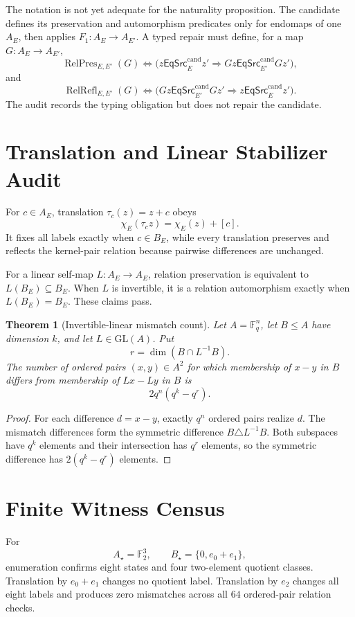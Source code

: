 \documentclass[11pt]{article}
\newtheorem{theorem}{Theorem}
\newcommand{\Ftwo}{\mathbb F_2}
\newcommand{\EqCand}{\mathsf{EqSrc}^{\mathrm{cand}}}
\begin{document}
The notation is not yet adequate for the naturality proposition. The candidate
defines its preservation and automorphism predicates only for endomaps of one
\(A_E\), then applies \(F_1:A_E\to A_{E'}\). A typed repair must define, for a
map \(G:A_E\to A_{E'}\),
\[
\operatorname{RelPres}_{E,E'}(G)
\Longleftrightarrow
\bigl(z\EqCand_Ez'\Rightarrow Gz\EqCand_{E'}Gz'\bigr),
\]
and
\[
\operatorname{RelRefl}_{E,E'}(G)
\Longleftrightarrow
\bigl(Gz\EqCand_{E'}Gz'\Rightarrow z\EqCand_Ez'\bigr).
\]
The audit records the typing obligation but does not repair the candidate.

\section{Translation and Linear Stabilizer Audit}

For \(c\in A_E\), translation \(\tau_c(z)=z+c\) obeys
\[
\chi_E(\tau_cz)=\chi_E(z)+[c].
\]
It fixes all labels exactly when \(c\in B_E\), while every translation
preserves and reflects the kernel-pair relation because pairwise differences
are unchanged.

For a linear self-map \(L:A_E\to A_E\), relation preservation is equivalent
to \(L(B_E)\subseteq B_E\). When \(L\) is invertible, it is a relation
automorphism exactly when \(L(B_E)=B_E\). These claims pass.

\begin{theorem}[Invertible-linear mismatch count]
Let \(A=\mathbb F_q^n\), let \(B\leq A\) have dimension \(k\), and let
\(L\in\mathrm{GL}(A)\). Put
\[
r=\dim(B\cap L^{-1}B).
\]
The number of ordered pairs \((x,y)\in A^2\) for which membership of
\(x-y\) in \(B\) differs from membership of \(Lx-Ly\) in \(B\) is
\[
2q^n(q^k-q^r).
\]
\end{theorem}

\begin{proof}
For each difference \(d=x-y\), exactly \(q^n\) ordered pairs realize \(d\).
The mismatch differences form the symmetric difference
\(B\triangle L^{-1}B\). Both subspaces have \(q^k\) elements and their
intersection has \(q^r\) elements, so the symmetric difference has
\(2(q^k-q^r)\) elements.
\end{proof}

\section{Finite Witness Census}

For
\[
A_\star=\Ftwo^3,\qquad
B_\star=\{0,e_0+e_1\},
\]
enumeration confirms eight states and four two-element quotient classes.
Translation by \(e_0+e_1\) changes no quotient label. Translation by \(e_2\)
changes all eight labels and produces zero mismatches across all \(64\)
ordered-pair relation checks.
\end{document}
